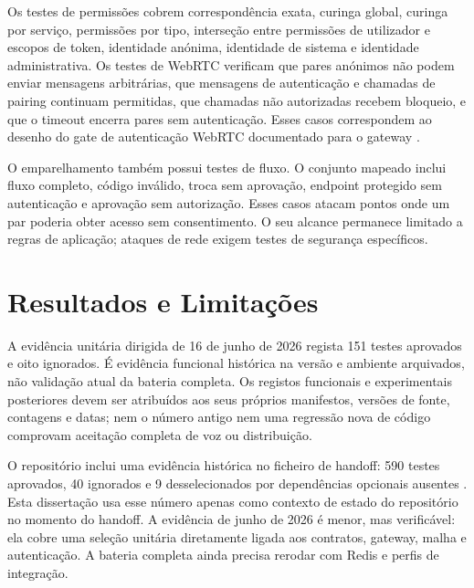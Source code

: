 Os testes de permiss\~{o}es cobrem correspond\^{e}ncia exata, curinga global, curinga por servi\c{c}o, permiss\~{o}es por tipo, interse\c{c}\~{a}o entre permiss\~{o}es de utilizador e escopos de token, identidade an\'{o}nima, identidade de sistema e identidade administrativa. Os testes de WebRTC verificam que pares an\'{o}nimos n\~{a}o podem enviar mensagens arbitr\'{a}rias, que mensagens de autentica\c{c}\~{a}o e chamadas de pairing continuam permitidas, que chamadas n\~{a}o autorizadas recebem bloqueio, e que o timeout encerra pares sem autentica\c{c}\~{a}o. Esses casos correspondem ao desenho do gate de autentica\c{c}\~{a}o WebRTC documentado para o gateway \cite{aurora_gateway_doc}.

O emparelhamento tamb\'{e}m possui testes de fluxo. O conjunto mapeado inclui fluxo completo, c\'{o}digo inv\'{a}lido, troca sem aprova\c{c}\~{a}o, endpoint protegido sem autentica\c{c}\~{a}o e aprova\c{c}\~{a}o sem autoriza\c{c}\~{a}o. Esses casos atacam pontos onde um par poderia obter acesso sem consentimento. O seu alcance permanece limitado a regras de aplica\c{c}\~{a}o; ataques de rede exigem testes de seguran\c{c}a espec\'{i}ficos.

\section{Resultados e Limita\c{c}\~{o}es}
\label{sec:resultados-limitacoes}

A evidência unitária dirigida de 16 de junho de 2026 regista 151 testes aprovados e oito ignorados. É evidência funcional histórica na versão e ambiente arquivados, não validação atual da bateria completa. Os registos funcionais e experimentais posteriores devem ser atribuídos aos seus próprios manifestos, versões de fonte, contagens e datas; nem o número antigo nem uma regressão nova de código comprovam aceitação completa de voz ou distribuição.

O reposit\'{o}rio inclui uma evid\^{e}ncia hist\'{o}rica no ficheiro de handoff: 590 testes aprovados, 40 ignorados e 9 desselecionados por depend\^{e}ncias opcionais ausentes \cite{aurora_handoff_doc}. Esta disserta\c{c}\~{a}o usa esse n\'{u}mero apenas como contexto de estado do reposit\'{o}rio no momento do handoff. A evid\^{e}ncia de junho de 2026 \'{e} menor, mas verific\'{a}vel: ela cobre uma sele\c{c}\~{a}o unit\'{a}ria diretamente ligada aos contratos, gateway, malha e autentica\c{c}\~{a}o. A bateria completa ainda precisa rerodar com Redis e perfis de integra\c{c}\~{a}o.

